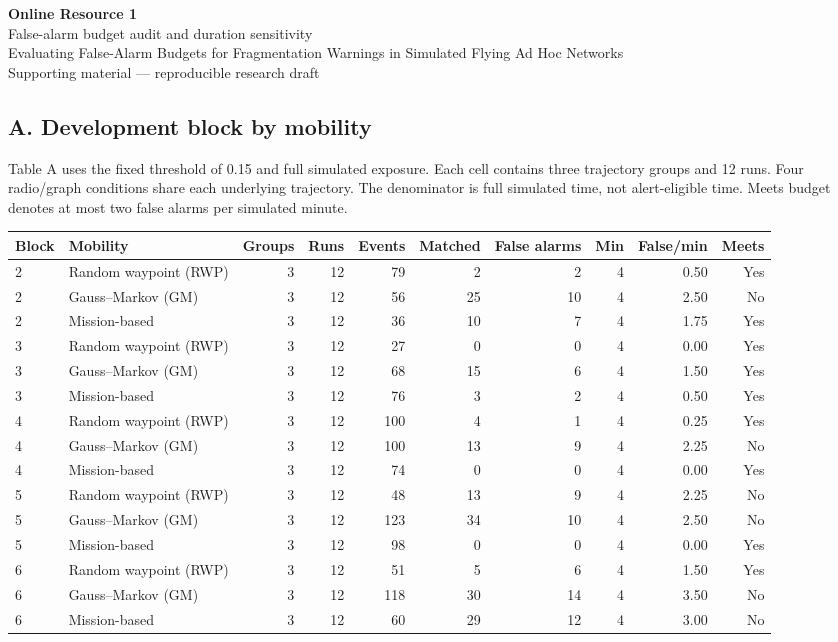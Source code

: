 \documentclass[10pt,a4paper]{article}
\begin{document}
\begin{center}
{\large\bfseries Online Resource 1}\\[0.65em]
{\large False-alarm budget audit and duration sensitivity}\\[0.5em]
Evaluating False-Alarm Budgets for Fragmentation Warnings in Simulated Flying Ad Hoc Networks\\[0.5em]
Supporting material --- reproducible research draft
\end{center}

\subsection*{A. Development block by mobility}
\noindent Table A uses the fixed threshold of 0.15 and full simulated exposure. Each cell contains three trajectory groups and 12 runs. Four radio/graph conditions share each underlying trajectory. The denominator is full simulated time, not alert-eligible time. Meets budget denotes at most two false alarms per simulated minute.

\begin{center}
\small
\setlength{\tabcolsep}{4pt}
\begin{adjustbox}{max width=\linewidth}\begin{tabular}{llrrrrrrrr}
\toprule
Block & Mobility & Groups & Runs & Events & Matched & False alarms & Min & False/min & Meets \\
\midrule
2 & Random waypoint (RWP) & 3 & 12 & 79 & 2 & 2 & 4 & 0.50 & Yes \\
2 & Gauss--Markov (GM) & 3 & 12 & 56 & 25 & 10 & 4 & 2.50 & No \\
2 & Mission-based & 3 & 12 & 36 & 10 & 7 & 4 & 1.75 & Yes \\
3 & Random waypoint (RWP) & 3 & 12 & 27 & 0 & 0 & 4 & 0.00 & Yes \\
3 & Gauss--Markov (GM) & 3 & 12 & 68 & 15 & 6 & 4 & 1.50 & Yes \\
3 & Mission-based & 3 & 12 & 76 & 3 & 2 & 4 & 0.50 & Yes \\
4 & Random waypoint (RWP) & 3 & 12 & 100 & 4 & 1 & 4 & 0.25 & Yes \\
4 & Gauss--Markov (GM) & 3 & 12 & 100 & 13 & 9 & 4 & 2.25 & No \\
4 & Mission-based & 3 & 12 & 74 & 0 & 0 & 4 & 0.00 & Yes \\
5 & Random waypoint (RWP) & 3 & 12 & 48 & 13 & 9 & 4 & 2.25 & No \\
5 & Gauss--Markov (GM) & 3 & 12 & 123 & 34 & 10 & 4 & 2.50 & No \\
5 & Mission-based & 3 & 12 & 98 & 0 & 0 & 4 & 0.00 & Yes \\
6 & Random waypoint (RWP) & 3 & 12 & 51 & 5 & 6 & 4 & 1.50 & Yes \\
6 & Gauss--Markov (GM) & 3 & 12 & 118 & 30 & 14 & 4 & 3.50 & No \\
6 & Mission-based & 3 & 12 & 60 & 29 & 12 & 4 & 3.00 & No \\
\bottomrule
\end{tabular}\end{adjustbox}
\end{center}
\end{document}

